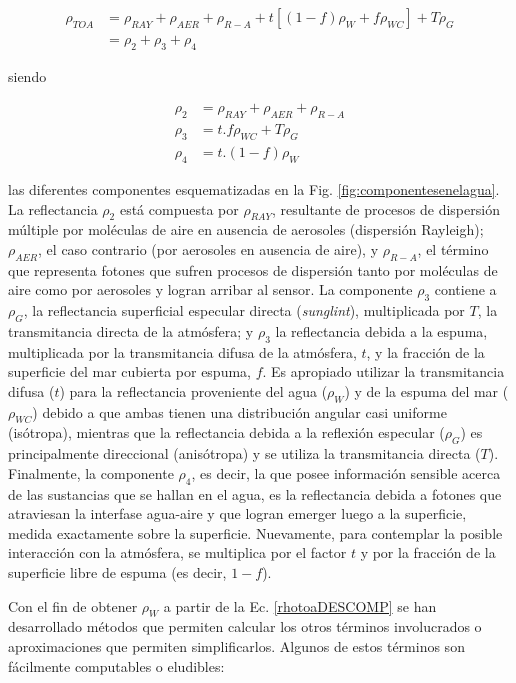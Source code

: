 \begin{align}
\rho_{TOA}&=\rho_{RAY}+\rho_{AER}+\rho_{R-A}+t[(1-f)\rho_{W}+f\rho_{WC}]+T\rho_{G}\\
&=\rho_{2}+\rho_{3}+\rho_{4}
\label{rhotoaDESCOMP}
\end{align}

siendo

\begin{align}
\rho_{2}&=\rho_{RAY}+\rho_{AER}+\rho_{R-A}\\
\rho_{3}&=t.f\rho_{WC}+T\rho_{G}\\
\rho_{4}&=t.(1-f)\rho_{W}
\label{rho2}
\end{align}

las diferentes componentes esquematizadas en la Fig. \ref{fig:componentesenelagua}. La reflectancia $\rho_{2}$ está compuesta por $\rho_{RAY}$, resultante de procesos de dispersión múltiple por moléculas de aire en ausencia de aerosoles (dispersión Rayleigh); $\rho_{AER}$, el caso contrario (por aerosoles en ausencia de aire), y $\rho_{R-A}$, el término que representa fotones que sufren procesos de dispersión tanto por moléculas de aire como por aerosoles y logran arribar al sensor.
La componente $\rho_{3}$ contiene a $\rho_{G}$, la reflectancia superficial especular directa (\textit{sunglint}), multiplicada por $T$, la transmitancia directa de la atmósfera; y $\rho_{3}$ la reflectancia debida a la espuma, multiplicada por la transmitancia difusa de la atmósfera, $t$, y la fracción de la superficie del mar cubierta por espuma, $f$.
Es apropiado utilizar la transmitancia difusa ($t$) para la reflectancia proveniente del agua ($\rho_{W}$) y de la espuma del mar ($\rho_{WC}$) debido a que ambas tienen una distribución angular
casi uniforme (isótropa), mientras que la reflectancia debida a la reflexión
especular ($\rho_{G}$) es principalmente direccional (anisótropa) y se utiliza la
transmitancia directa ($T$).
Finalmente, la componente $\rho_{4}$, es decir, la que posee información sensible acerca de las sustancias que se hallan en el agua, es la reflectancia debida a fotones que atraviesan la interfase agua-aire y que logran emerger luego a la superficie, medida exactamente sobre la superficie. Nuevamente, para contemplar la posible interacción con la atmósfera, se multiplica por el factor $t$ y por la fracción de la superficie libre de espuma (es decir, $1-f$).

Con el fin de obtener $\rho_{W}$ a partir de la Ec. \ref{rhotoaDESCOMP} se han desarrollado métodos
que permiten calcular los otros términos involucrados o aproximaciones que
permiten simplificarlos. Algunos de estos términos son fácilmente computables o eludibles:

